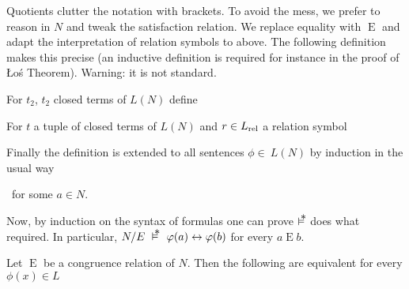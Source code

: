 \documentclass[creche.tex]{subfiles}
\begin{document}
\noindent\llap{\textcolor{red}{\Large\danger}\kern1.5ex}Quotients clutter the notation with brackets. To avoid the mess, we prefer to reason in $N$ and tweak the satisfaction relation.  We replace equality with $\mathrel{E}$ and adapt the interpretation of relation symbols to  above. The following definition makes this precise (an inductive definition is required for instance in the proof of \L o\'{s} Theorem). Warning: it is not standard. 

\begin{definition}\label{def_pseudostructure}
For $t_2$, $t_2$ closed terms of $L(N)$ define


For $t$ a tuple of closed terms of $L(N)$ and $r\in L_{\rm rel}$ a relation symbol


Finally the definition is extended to all sentences $\phi\in\ L(N)$ by induction in the usual way



\ for some $a\in N$.\QED
\end{definition}

% 
% 
% 

Now, by induction on the syntax of formulas one can prove $\pmodels$ does what required. In particular, $N/E\ \pmodels\ \phi(a)\iff\phi(b)$ for every $a\mathrel{E} b$.

\begin{proposition}\label{prop_pseudomodel}
Let $\mathrel{E}$ be a congruence relation of $N$. Then the following are equivalent for every $\phi(x)\in L$


\QED
\end{proposition}
\end{document}
